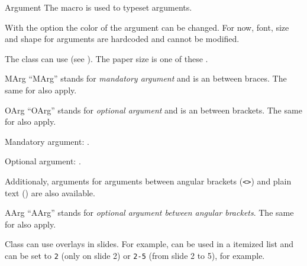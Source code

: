 \documentclass[11pt, outputdir = ./out]{article}
\begin{document}
\begin{Macrodef}{Argument}{}{}
    The  macro is used to typeset arguments.

    With the option  the color of the argument can be changed. For now, font, size and shape for arguments are hardcoded and cannot be modified.
\end{Macrodef}

\begin{example}{}
    The  class can use  (see ). The paper size is one of these .
\end{example}

\begin{Macrodef}{MArg}{}{}
    ``MArg'' stands for \textit{mandatory argument} and is an  between braces. The same  for  also apply.
\end{Macrodef}

\begin{Macrodef}{OArg}{}{}
    ``OArg'' stands for \textit{optional argument} and is an  between brackets. The same  for  also apply.
\end{Macrodef}

\begin{example}{}
    Mandatory argument: .\par
    Optional argument: .
\end{example}

Additionaly, arguments for arguments between angular brackets (\texttt{<>}) and plain text () are also available.

\begin{Macrodef}{AArg}{}{}
    ``AArg'' stands for \textit{optional argument between angular brackets}. The same  for  also apply.
\end{Macrodef}

\begin{example}{}
    Class  can use overlays in slides. For example,  can be used in a itemized list and  can be set to \texttt{2} (only on slide 2) or \texttt{2-5} (from slide 2 to 5), for example.
\end{example}
\end{document}
